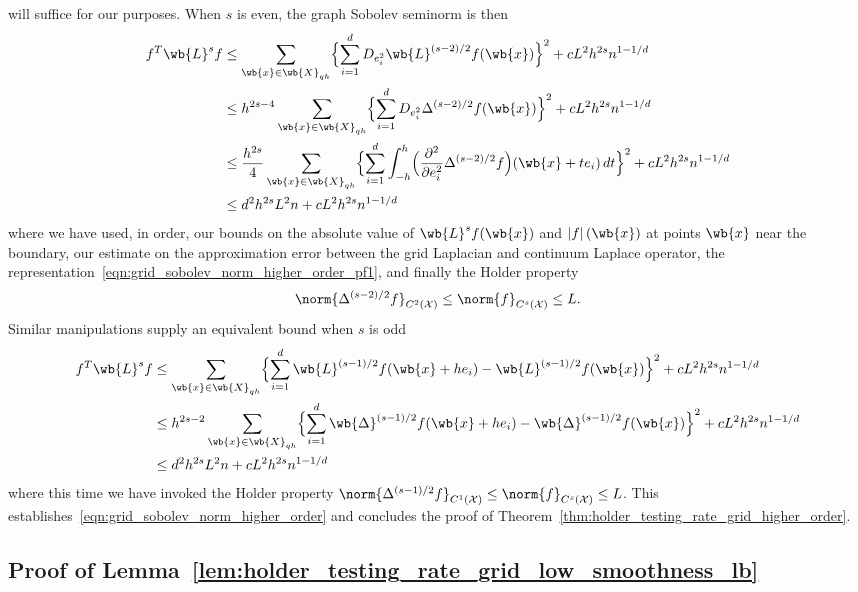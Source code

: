 \documentclass{article}
\newcommand{\abs}[1]{\left \lvert #1 \right \rvert}
\newcommand{\1}{\mathbf{1}}
\newcommand{\Xset}{\mathcal{X}}
\theoremstyle{alden}
\theoremstyle{aldenthm}
\theoremstyle{definition}
\theoremstyle{remark}
\begin{document}
will suffice for our purposes. When $s$ is even, the graph Sobolev seminorm is then
\begin{align*}
f^T \wb{L}^s f & \leq \sum_{\wb{x} \in \wb{X}_{qh}} \Bigl\{\sum_{i = 1}^d D_{e_i^2} \wb{L}^{(s - 2)/2}f(\wb{x}) \Bigr\}^2 + cL^2h^{2s}n^{1 - 1/d} \\
& \leq h^{2s - 4}\sum_{\wb{x} \in \wb{X}_{qh}} \Bigl\{\sum_{i = 1}^d D_{e_i^2} \Delta^{(s - 2)/2}f(\wb{x}) \Bigr\}^2 + cL^2h^{2s}n^{1 - 1/d} \\
& \leq \frac{h^{2s}}{4}\sum_{\wb{x} \in \wb{X}_{qh}} \Bigl\{\sum_{i = 1}^d \int_{-h}^{h} \Bigl(\frac{\partial^2}{\partial e_i^2}\Delta^{(s - 2)/2}f\Bigr)(\wb{x} + te_i) \,dt \Bigr\}^2 + cL^2h^{2s}n^{1 - 1/d} \\
& \leq d^2 h^{2s} L^2 n + cL^2h^{2s}n^{1 - 1/d}
\end{align*}
where we have used, in order, our bounds on the absolute value of $\wb{L}^sf(\wb{x})$ and $\abs{f}(\wb{x})$ at points $\wb{x}$ near the boundary, our estimate on the approximation error between the grid Laplacian and continuum Laplace operator, 
the representation~\eqref{eqn:grid_sobolev_norm_higher_order_pf1}, and finally the Holder property
\begin{equation*}
\norm{\Delta^{(s - 2)/2}f}_{C^2(\Xset)} \leq \norm{f}_{C^s(\Xset)} \leq L.
\end{equation*}
Similar manipulations supply an equivalent bound when $s$ is odd
\begin{align*}
f^T \wb{L}^s f & \leq \sum_{\wb{x} \in \wb{X}_{qh}} \Bigl\{\sum_{i = 1}^d \wb{L}^{(s - 1)/2}f(\wb{x} + he_i) - \wb{L}^{(s - 1)/2}f(\wb{x}) \Bigr\}^2 + cL^2h^{2s}n^{1 - 1/d} \\
& \leq h^{2s - 2}\sum_{\wb{x} \in \wb{X}_{qh}} \Bigl\{\sum_{i = 1}^d \wb{\Delta}^{(s - 1)/2}f(\wb{x} + he_i) - \wb{\Delta}^{(s - 1)/2}f(\wb{x}) \Bigr\}^2 + cL^2h^{2s}n^{1 - 1/d} \\
& \leq d^2 h^{2s} L^2 n + cL^2h^{2s}n^{1 - 1/d}
\end{align*}
where this time we have invoked the Holder property $\norm{\Delta^{(s - 1)/2}f}_{C^1(\Xset)} \leq \norm{f}_{C^s(\Xset)} \leq L$. This establishes~\eqref{eqn:grid_sobolev_norm_higher_order} and concludes the proof of Theorem~\ref{thm:holder_testing_rate_grid_higher_order}.

\subsection{Proof of Lemma~\ref{lem:holder_testing_rate_grid_low_smoothness_lb}}
\end{document}
